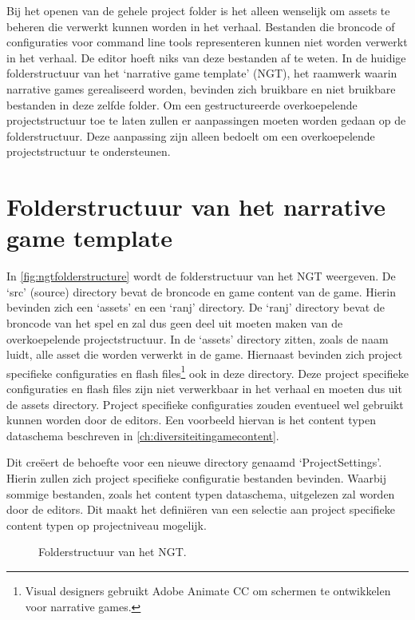 Bij het openen van de gehele project folder is het alleen wenselijk om assets te beheren die verwerkt kunnen worden in het verhaal. Bestanden die broncode of configuraties voor command line tools representeren kunnen niet worden verwerkt in het verhaal. De editor hoeft niks van deze bestanden af te weten. In de huidige folderstructuur van het ‘narrative game template’ (NGT), het raamwerk waarin narrative games gerealiseerd worden, bevinden zich bruikbare en niet bruikbare bestanden in deze zelfde folder. Om een gestructureerde overkoepelende projectstructuur toe te laten zullen er aanpassingen moeten worden gedaan op de folderstructuur. Deze aanpassing zijn alleen bedoelt om een overkoepelende projectstructuur te ondersteunen.

\section{Folderstructuur van het narrative game template}
In \autoref{fig:ngtfolderstructure} wordt de folderstructuur van het NGT weergeven. De ‘src’ (source) directory bevat de broncode en game content van de game. Hierin bevinden zich een ‘assets’ en een ‘ranj’ directory. De ‘ranj’ directory bevat de broncode van het spel en zal dus geen deel uit moeten maken van de overkoepelende projectstructuur. In de ‘assets’ directory zitten, zoals de naam luidt, alle asset die worden verwerkt in de game. Hiernaast bevinden zich project specifieke configuraties en flash files\footnote{Visual designers gebruikt Adobe Animate CC om schermen te ontwikkelen voor narrative games.} ook in deze directory. Deze project specifieke configuraties en flash files zijn niet verwerkbaar in het verhaal en moeten dus uit de assets directory. Project specifieke configuraties zouden eventueel wel gebruikt kunnen worden door de editors. Een voorbeeld hiervan is het content typen dataschema beschreven in \autoref{ch:diversiteitingamecontent}. 

Dit creëert de behoefte voor een nieuwe directory genaamd ‘ProjectSettings’. Hierin zullen zich project specifieke configuratie bestanden bevinden. Waarbij sommige bestanden, zoals het content typen dataschema, uitgelezen zal worden door de editors. Dit maakt het definiëren van een selectie aan project specifieke content typen op projectniveau mogelijk.

\begin{figure}[htb]
    \caption{Folderstructuur van het NGT.}
    \label{fig:ngtfolderstructure}
\end{figure}


